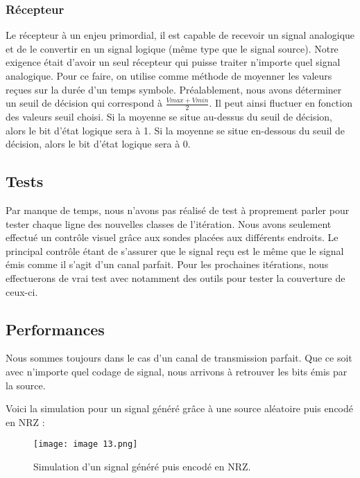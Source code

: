 \subsubsection{Récepteur}

Le récepteur à un enjeu primordial, il est capable de recevoir un signal analogique et de le convertir en un signal logique (même type que le signal source). Notre exigence était d'avoir un seul récepteur qui puisse traiter n'importe quel signal analogique.
Pour ce faire, on utilise comme méthode de moyenner les valeurs reçues sur la durée d'un temps symbole. Préalablement, nous avons déterminer un seuil de décision qui correspond à $\frac{Vmax + Vmin}{2}$.
Il peut ainsi fluctuer en fonction des valeurs seuil choisi. Si la moyenne se situe au-dessus du seuil de décision, alors le bit d'état logique sera à 1. Si la moyenne se situe en-dessous du seuil de décision, alors le bit d'état logique sera à 0.

\subsection{Tests}

Par manque de temps, nous n'avons pas réalisé de test à proprement parler pour tester chaque ligne des nouvelles classes de l'itération. Nous avons seulement effectué un contrôle visuel grâce aux sondes placées aux différents endroits. Le principal contrôle étant de s'assurer que le signal reçu est le même que le signal émis comme il s'agit d'un canal parfait.
Pour les prochaines itérations, nous effectuerons de vrai test avec notamment des outils pour tester la couverture de ceux-ci.

\subsection{Performances}

Nous sommes toujours dans le cas d'un canal de transmission parfait. Que ce soit avec n'importe quel codage de signal, nous arrivons à retrouver les bits émis par la source.

Voici la simulation pour un signal généré grâce à une source aléatoire puis encodé en NRZ :

\begin{figure}[H]
    \centering
    \texttt{[image: image 13.png]}
    \caption{\label{fig:image13}Simulation d'un signal généré puis encodé en NRZ.}
\end{figure}

